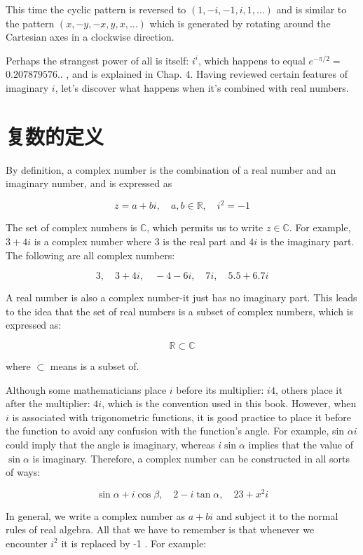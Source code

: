 This time the cyclic pattern is reversed to $(1,-i,-1, i, 1, \ldots)$ and is similar to the pattern $(x,-y,-x, y, x, \ldots)$ which is generated by rotating around the Cartesian axes in a clockwise direction.

Perhaps the strangest power of all is itself: $i^{i}$, which happens to equal $e^{-\pi / 2}=$ $0.207879576 .$. , and is explained in Chap. 4. Having reviewed certain features of imaginary $i$, let's discover what happens when it's combined with real numbers.

\section{复数的定义}
By definition, a complex number is the combination of a real number and an imaginary number, and is expressed as

$$
z=a+b i, \quad a, b \in \mathbb{R}, \quad i^{2}=-1
$$

The set of complex numbers is $\mathbb{C}$, which permits us to write $z \in \mathbb{C}$. For example, $3+4 i$ is a complex number where 3 is the real part and $4 i$ is the imaginary part. The following are all complex numbers:

$$
3, \quad 3+4 i, \quad-4-6 i, \quad 7 i, \quad 5.5+6.7 i
$$

A real number is also a complex number-it just has no imaginary part. This leads to the idea that the set of real numbers is a subset of complex numbers, which is expressed as:

$$
\mathbb{R} \subset \mathbb{C}
$$

where $\subset$ means is a subset of.

Although some mathematicians place $i$ before its multiplier: $i 4$, others place it after the multiplier: $4 i$, which is the convention used in this book. However, when $i$ is associated with trigonometric functions, it is good practice to place it before the function to avoid any confusion with the function's angle. For example, sin $\alpha i$ could imply that the angle is imaginary, whereas $i \sin \alpha$ implies that the value of $\sin \alpha$ is imaginary. Therefore, a complex number can be constructed in all sorts of ways:

$$
\sin \alpha+i \cos \beta, \quad 2-i \tan \alpha, \quad 23+x^{2} i
$$

In general, we write a complex number as $a+b i$ and subject it to the normal rules of real algebra. All that we have to remember is that whenever we encounter $i^{2}$ it is replaced by -1 . For example:

